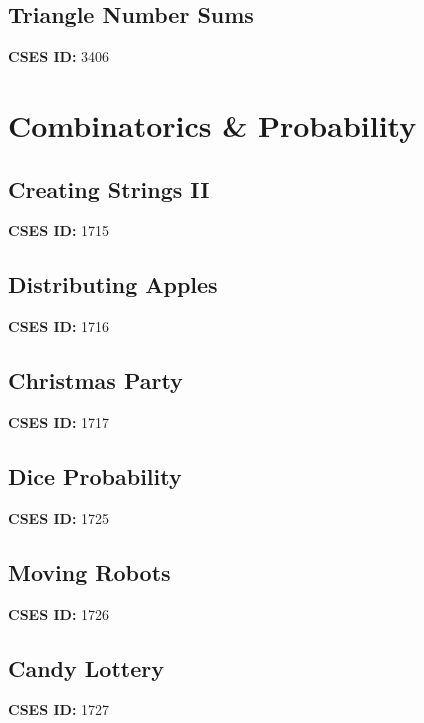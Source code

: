 \documentclass[10pt, a4paper, twocolumn, landscape]{article}
\begin{document}
\subsection{Triangle Number Sums}
\textbf{CSES ID:} 3406 \\

\vspace{0.2cm}
\section{Combinatorics \& Probability}
\subsection{Creating Strings II}
\textbf{CSES ID:} 1715 \\

\vspace{0.2cm}
\subsection{Distributing Apples}
\textbf{CSES ID:} 1716 \\

\vspace{0.2cm}
\subsection{Christmas Party}
\textbf{CSES ID:} 1717 \\

\vspace{0.2cm}
\subsection{Dice Probability}
\textbf{CSES ID:} 1725 \\

\vspace{0.2cm}
\subsection{Moving Robots}
\textbf{CSES ID:} 1726 \\

\vspace{0.2cm}
\subsection{Candy Lottery}
\textbf{CSES ID:} 1727 \\

\vspace{0.2cm}
\end{document}
